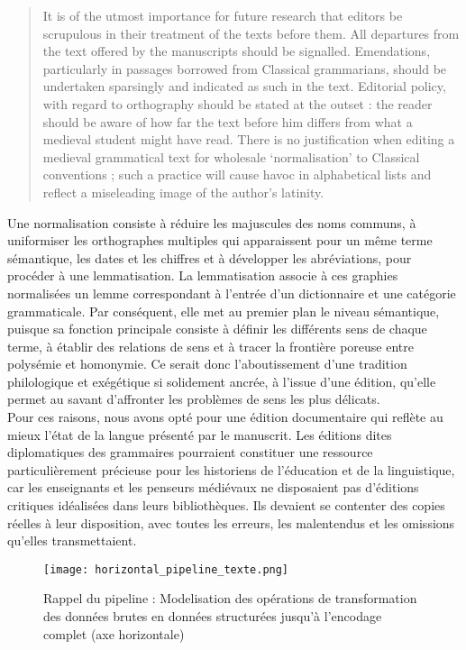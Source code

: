 \documentclass[a4paper, twoside, 12pt]{book}
\begin{document}
\blockquote{It is of the utmost importance for future research that editors be scrupulous in their treatment of the texts before them. All departures from the text offered by the manuscripts should be signalled. Emendations, particularly in passages borrowed from Classical grammarians, should be undertaken sparsingly and indicated as such in the text. Editorial policy, with regard to orthography should be stated at the outset : the reader should be aware of how far the text before him differs from what a medieval student might have read. There is no justification when editing a medieval grammatical text for wholesale ‘normalisation’ to Classical conventions ; such a practice will cause havoc in alphabetical lists and reflect a miseleading image of the author’s latinity.} 

Une normalisation consiste à réduire les majuscules des noms communs, à uniformiser les orthographes multiples qui apparaissent pour un même terme sémantique, les dates et les chiffres et à développer les abréviations, pour procéder à une lemmatisation. La lemmatisation associe à ces graphies normalisées un lemme correspondant à l'entrée d'un dictionnaire et une catégorie grammaticale. Par conséquent, elle met au premier plan le niveau sémantique, puisque sa fonction principale consiste à définir les différents sens de chaque terme, à établir des relations de sens et à tracer la frontière poreuse entre polysémie et homonymie. Ce serait donc l'aboutissement d'une tradition philologique et exégétique si solidement ancrée, à l'issue d'une édition, qu'elle permet au savant d'affronter les problèmes de sens les plus délicats.\\

Pour ces raisons, nous avons opté pour une édition documentaire qui reflète au mieux l'état de la langue présenté par le manuscrit. Les éditions dites diplomatiques des grammaires pourraient constituer une ressource particulièrement précieuse pour les historiens de l'éducation et de la linguistique, car les enseignants et les penseurs médiévaux ne disposaient pas d'éditions critiques idéalisées dans leurs bibliothèques. Ils devaient se contenter des copies réelles à leur disposition, avec toutes les erreurs, les malentendus et les omissions qu'elles transmettaient. \\

\begin{figure}[H]
    \centering
    \texttt{[image: horizontal\_pipeline\_texte.png]}
    \caption{ Rappel du pipeline  : Modelisation des opérations de transformation des données brutes en données structurées jusqu'à l'encodage complet (axe horizontale)}
\end{figure}
\end{document}
